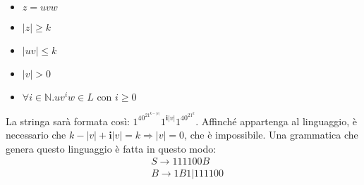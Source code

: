\documentclass[a4paper,oneside]{scrbook}
\newcommand{\greenmark}{\quad \textcolor{green}{\checkmark}}
\begin{document}
\begin{itemize}
	\item $z=uvw$
	\item $|z|\geq k$
	\item $|uv|\leq k$
	\item $|v|>0$
	\item $\forall i \in \mathbb{N}.uv^iw\in L \text{ con }i\geq0$
\end{itemize}
La stringa sarà formata così: $1^40^21^{k-|v|}1^{\textbf{i}|v|}1^40^21^k$.
Affinché appartenga al linguaggio, è necessario che $k-|v|+\textbf{i}|v|=k \Rightarrow |v|=0$, che è impossibile. \greenmark
Una grammatica che genera questo linguaggio è fatta in questo modo:
\begin{align*}
	&S \rightarrow 111100B\\
	&B \rightarrow 1B1|111100
\end{align*}
\end{document}
